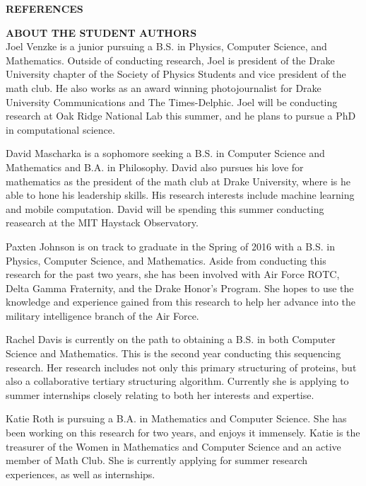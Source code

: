 \documentclass{article}
\begin{document}
\noindent\textbf {REFERENCES}
\clearpage



\vspace{1cm}
\noindent\textbf{ABOUT THE STUDENT AUTHORS}\\
\indent Joel Venzke is a junior pursuing a B.S. in Physics, Computer Science, and  Mathematics. Outside of conducting research, Joel is president of the Drake University chapter of the Society of Physics Students and vice president of the math club. He also works as an award winning photojournalist for Drake University Communications and The Times-Delphic. Joel will be conducting research at Oak Ridge National Lab this summer, and he plans to pursue a PhD in computational science.

David Mascharka is a sophomore seeking a B.S. in Computer Science and Mathematics and B.A. in Philosophy. David also pursues his love for mathematics as the president of the math club at Drake University, where is he able to hone his leadership skills. His research interests include machine learning and mobile computation. David will be spending this summer conducting reasearch at the MIT Haystack Observatory.

Paxten Johnson is on track to graduate in the Spring of 2016 with a B.S. in Physics, Computer Science, and Mathematics. Aside from conducting this research for the past two years, she has been involved with Air Force ROTC, Delta Gamma Fraternity, and the Drake Honor's Program. She hopes to use the knowledge and experience gained from this research to help her advance into the military intelligence branch of the Air Force.

Rachel Davis is currently on the path to obtaining a B.S. in both Computer Science and Mathematics. This is the second year conducting this sequencing research. Her research includes not only this primary structuring of proteins, but also a collaborative tertiary structuring algorithm. Currently she is applying to summer internships closely relating to both her interests and expertise. 

Katie Roth is pursuing a B.A. in Mathematics and Computer Science. She has been working on this research for two years, and enjoys it immensely. Katie is the treasurer of the Women in Mathematics and Computer Science and an active member of Math Club. She is currently applying for summer research experiences, as well as internships. 
\end{document}
